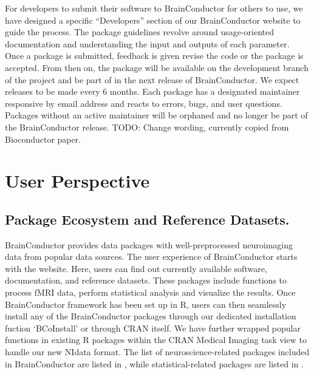\documentclass{nature}
\begin{document}
For developers to submit their software to BrainConductor for others to use,
we have designed a specific ``Developers'' section of our BrainConductor website
to guide the process. The package guidelines revolve around usage-oriented
documentation and understanding the input and outputs of each parameter.
 Once 
a package is submitted, feedback is given revise the code or the package is accepted.
From then on, the package will be available on the
development branch of the project and be part of in the next release of BrainConductor.
We expect releases to be made every 6 months.
Each package has a designated maintainer responsive by email address and reacts to
errors, bugs, and user questions. Packages without an active maintainer will be
orphaned and no longer be part of the BrainConductor release.
{\color{red}TODO: Change wording, currently copied from Bioconductor paper.}


\section{User Perspective}


\subsection{Package Ecosystem and Reference Datasets.}
BrainConductor provides data packages with well-preprocessed neuroimaging data
from popular data sources.
The user experience of BrainConductor starts with the website. Here, users can 
find out currently available software, documentation, and reference datasets.
These packages include functions to process fMRI data, perform statistical
analysis and visualize the results.
Once BrainConductor framework has been set up in R, users can then
seamlessly install any of the BrainConductor packages through our
dedicated installation fuction `BCoInstall' or through CRAN itself.
We have further wrapped popular functions in existing R packages
within the CRAN Medical Imaging task view to handle our new NIdata format.
The list of neuroscience-related packages included in BrainConductor are listed 
in , while statistical-related packages are listed in
.
\end{document}

